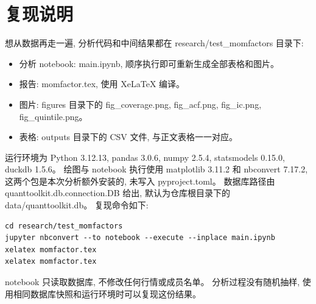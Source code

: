 \documentclass[11pt,a4paper]{article}
\begin{document}
\section{复现说明}
\label{app:reproduce}

想从数据再走一遍, 分析代码和中间结果都在 research/test\_momfactors 目录下:

\begin{itemize}
\item 分析 notebook: main.ipynb, 顺序执行即可重新生成全部表格和图片。
\item 报告: momfactor.tex, 使用 XeLaTeX 编译。
\item 图片: figures 目录下的 fig\_coverage.png, fig\_acf.png, fig\_ic.png, fig\_quintile.png。
\item 表格: outputs 目录下的 CSV 文件, 与正文表格一一对应。
\end{itemize}

运行环境为 Python 3.12.13, pandas 3.0.6, numpy 2.5.4, statsmodels 0.15.0, duckdb 1.5.6。
绘图与 notebook 执行使用 matplotlib 3.11.2 和 nbconvert 7.17.2, 这两个包是本次分析额外安装的, 未写入 pyproject.toml。
数据库路径由 quanttoolkit.db.connection.DB 给出, 默认为仓库根目录下的 data/quanttoolkit.db。
复现命令如下:

\begin{verbatim}
cd research/test_momfactors
jupyter nbconvert --to notebook --execute --inplace main.ipynb
xelatex momfactor.tex
xelatex momfactor.tex
\end{verbatim}

notebook 只读取数据库, 不修改任何行情或成员名单。
分析过程没有随机抽样, 使用相同数据库快照和运行环境时可以复现这份结果。
\end{document}
